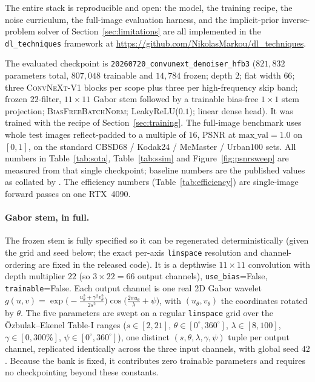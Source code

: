 \documentclass{article}
\newcommand{\convnext}{\textsc{ConvNeXt}}
\newcommand{\bfbn}{\textsc{BiasFreeBatchNorm}}
\begin{document}
The entire stack is reproducible and open: the model, the training recipe, the noise curriculum, the full-image evaluation harness, and the implicit-prior inverse-problem solver of Section~\ref{sec:limitations} are all implemented in the \texttt{dl\_techniques} framework at \url{https://github.com/NikolasMarkou/dl_techniques}.

The evaluated checkpoint is \texttt{20260720\_convunext\_denoiser\_hfb3} ($821{,}832$ parameters total, $807{,}048$ trainable and $14{,}784$ frozen; depth $2$; flat width $66$; three \convnext{}-V1 blocks per scope plus three per high-frequency skip band; frozen $22$-filter, $11{\times}11$ Gabor stem followed by a trainable bias-free $1{\times}1$ stem projection; \bfbn{}; LeakyReLU($0.1$); linear dense head). It was trained with the recipe of Section~\ref{sec:training}. The full-image benchmark uses whole test images reflect-padded to a multiple of $16$, PSNR at $\mathrm{max\_val}=1.0$ on $[0,1]$, on the standard CBSD68 / Kodak24 / McMaster / Urban100 sets. All numbers in Table~\ref{tab:sota}, Table~\ref{tab:ssim} and Figure~\ref{fig:psnrsweep} are measured from that single checkpoint; baseline numbers are the published values as collated by \citet{zhang2022scunet}. The efficiency numbers (Table~\ref{tab:efficiency}) are single-image forward passes on one RTX~4090.

\paragraph{Gabor stem, in full.} The frozen stem is fully specified so it can be regenerated deterministically (given the grid and seed below; the exact per-axis \texttt{linspace} resolution and channel-ordering are fixed in the released code). It is a depthwise $11{\times}11$ convolution with depth multiplier $22$ (so $3{\times}22{=}66$ output channels), \texttt{use\_bias}=False, \texttt{trainable}=False. Each output channel is one real 2D Gabor wavelet $g(u,v)=\exp\!\big(-\tfrac{u_\theta^2+\gamma^2 v_\theta^2}{2s^2}\big)\cos\!\big(\tfrac{2\pi u_\theta}{\lambda}+\psi\big)$, with $(u_\theta,v_\theta)$ the coordinates rotated by $\theta$. The five parameters are swept on a regular \texttt{linspace} grid over the Özbulak--Ekenel Table-I ranges ($s\in[2,21]$, $\theta\in[0^\circ,360^\circ]$, $\lambda\in[8,100]$, $\gamma\in[0,300\%]$, $\psi\in[0^\circ,360^\circ]$), one distinct $(s,\theta,\lambda,\gamma,\psi)$ tuple per output channel, replicated identically across the three input channels, with global seed $42$. Because the bank is fixed, it contributes zero trainable parameters and requires no checkpointing beyond these constants.
\end{document}

